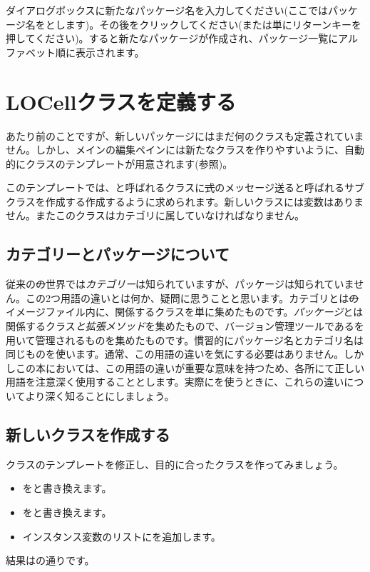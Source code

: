 \documentclass[a4paper,10pt,twoside]{book}
\begin{document}
ダイアログボックスに新たなパッケージ名を入力してください(ここではパッケージ名をとします)。その後をクリックしてください(または単にリターンキーを押してください)。すると新たなパッケージが作成され、パッケージ一覧にアルファベット順に表示されます。

\section{LOCellクラスを定義する}

あたり前のことですが、新しいパッケージにはまだ何のクラスも定義されていません。しかし、メインの編集ペインには新たなクラスを作りやすいように、自動的にクラスのテンプレートが用意されます(参照)。

このテンプレートでは、と呼ばれるクラスに\st 式のメッセージ送ると呼ばれるサブクラスを作成する作成するように求められます。新しいクラスには変数はありません。またこのクラスはカテゴリに属していなければなりません。

\subsection{カテゴリーとパッケージについて}

従来の\st の世界では\emph{カテゴリー}は知られていますが、パッケージは知られていません。この2つ用語の違いとは何か、疑問に思うことと思います。カテゴリとは\st のイメージファイル内に、関係するクラスを単に集めたものです。\emph{パッケージ}とは関係するクラス\emph{と拡張メソッド}を集めたもので、バージョン管理ツールであるを用いて管理されるものを集めたものです。慣習的にパッケージ名とカテゴリ名は同じものを使います。通常、この用語の違いを気にする必要はありません。しかしこの本においては、この用語の違いが重要な意味を持つため、各所にて正しい用語を注意深く使用することとします。実際にを使うときに、これらの違いについてより深く知ることにしましょう。


\subsection{新しいクラスを作成する}

クラスのテンプレートを修正し、目的に合ったクラスを作ってみましょう。

\begin{itemize}
  \item {}をと書き換えます。
  \item {}をと書き換えます。
  \item インスタンス変数のリストにを追加します。
\end{itemize}
結果はの通りです。
\end{document}
